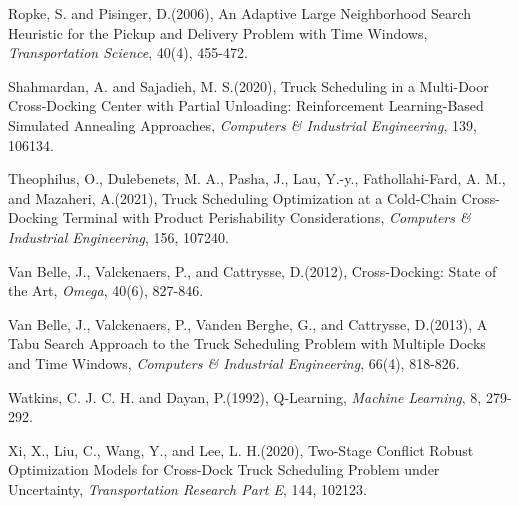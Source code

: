 \documentclass[10pt,a4paper]{article}
\begin{document}
\begin{description}
\item Ropke, S. and Pisinger, D.(2006), An Adaptive Large Neighborhood Search Heuristic for the Pickup and Delivery Problem with Time Windows, \emph{Transportation Science}, 40(4), 455-472.
\item Shahmardan, A. and Sajadieh, M. S.(2020), Truck Scheduling in a Multi-Door Cross-Docking Center with Partial Unloading: Reinforcement Learning-Based Simulated Annealing Approaches, \emph{Computers \& Industrial Engineering}, 139, 106134.
\item Theophilus, O., Dulebenets, M. A., Pasha, J., Lau, Y.-y., Fathollahi-Fard, A. M., and Mazaheri, A.(2021), Truck Scheduling Optimization at a Cold-Chain Cross-Docking Terminal with Product Perishability Considerations, \emph{Computers \& Industrial Engineering}, 156, 107240.
\item Van Belle, J., Valckenaers, P., and Cattrysse, D.(2012), Cross-Docking: State of the Art, \emph{Omega}, 40(6), 827-846.
\item Van Belle, J., Valckenaers, P., Vanden Berghe, G., and Cattrysse, D.(2013), A Tabu Search Approach to the Truck Scheduling Problem with Multiple Docks and Time Windows, \emph{Computers \& Industrial Engineering}, 66(4), 818-826.
\item Watkins, C. J. C. H. and Dayan, P.(1992), Q-Learning, \emph{Machine Learning}, 8, 279-292.
\item Xi, X., Liu, C., Wang, Y., and Lee, L. H.(2020), Two-Stage Conflict Robust Optimization Models for Cross-Dock Truck Scheduling Problem under Uncertainty, \emph{Transportation Research Part E}, 144, 102123.
\end{description}
\end{document}
